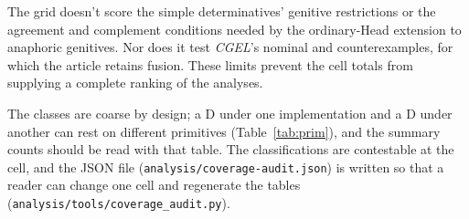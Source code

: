 \documentclass[12pt]{article}
\begin{document}
The grid doesn't score the simple determinatives' genitive restrictions or the agreement and complement conditions needed by the ordinary-Head extension to anaphoric genitives. Nor does it test \textit{CGEL}'s nominal  and  counterexamples, for which the article retains fusion. These limits prevent the cell totals from supplying a complete ranking of the analyses.

The classes are coarse by design; a D under one implementation and a D under another can rest on different primitives (Table~\ref{tab:prim}), and the summary counts should be read with that table. The classifications are contestable at the cell, and the JSON file (\texttt{analysis/coverage-audit.json}) is written so that a reader can change one cell and regenerate the tables (\texttt{analysis/tools/coverage\_audit.py}).

\printbibliography
\end{document}

